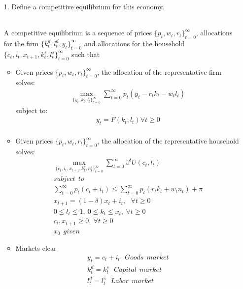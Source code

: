 \documentclass[a4paper]{article}
\begin{document}
\begin{enumerate}
\item[1.] Define a competitive equilibrium for this economy.\\~\

A competitive equilibrium is a sequence of prices $\{p_{t},w_{t}, r_{t}\}^{\infty}_{t=0}$, allocations for the firm $\{ k^{d}_{t}, l^{d}_{t}, y_{t} \}^{\infty}_{t=0}$ and allocations for the household $ \{ c_{t}, i_{t}, x_{t+1}, k^{s}_{t}, l^{s}_{t} \}^{\infty}_{t=0}$ such that
\begin{itemize}
\item Given prices $\{p_{t},w_{t}, r_{t}\}^{\infty}_{t=0}$, the allocation of the representative firm solves: 
\begin{align*}
\max_{ \{ y_{t}, k_{t}, l_{t} \}^{\infty}_{t=0} } \sum^{\infty}_{t=0} p_{t}(y_{t}- r_{t}k_{t} - w_{t}l_{t})
\end{align*}
subject to:
\begin{align*}
y_{t} = F(k_{t}, l_{t}) \forall t\geq 0 \\
\end{align*}


\item Given prices $\{p_{t},w_{t}, r_{t}\}^{\infty}_{t=0}$, the allocation of the representative household solves: 
\begin{align*}
\max_{ \{ c_{t}, i_{t}, x_{t+1}, k^{s}_{t}, n^{s}_{t} \}^{\infty}_{t=0}} \sum^{\infty}_{t=0} \beta^{t} U(c_{t}, l_t) \\
subject \: \: to \\
\sum^{\infty}_{t=0} p_{t}(c_{t} + i_{t}) \leq \sum^{\infty}_{t=0} p_{t}(r_{t}k_{t} + w_{t}n_{t}) + \pi \\
x_{t+1} = (1-\delta)x_{t} + i_{t}, \: \: \: \forall t \geq 0 \\
0 \leq l_{t} \leq 1, \: 0 \leq k_{t} \leq x_{t}, \: \forall	t \geq 0\\
c_{t}, x_{t+1} \geq 0, \: \forall t \geq 0 \\
x_{0} \: \: given
\end{align*}

\item Markets clear
\begin{align*}
y_{t} = c_{t} + i_{t} \: \: \: Goods \: \: market \\
k^{d}_{t} = k^{s}_{t} \: \: \: Capital \: \: market \\
l^{d}_{t} = l^{s}_{t} \: \: \: Labor \: \: market
\end{align*}
\end{itemize}



\end{enumerate}
\end{document}
